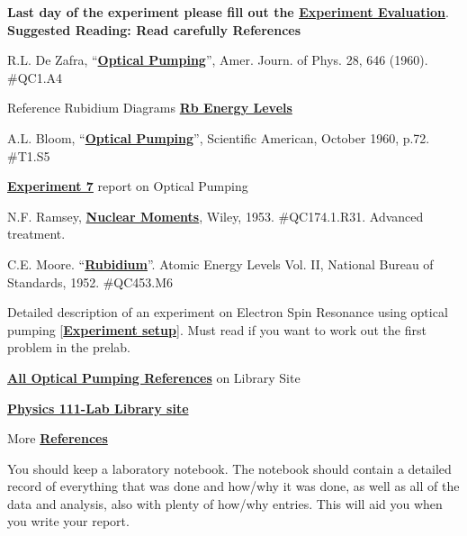 \documentclass{../lab}
\newcommand{\OpticalPumpingZafra}{http://physics111.lib.berkeley.edu/Physics111/Reprints/OPT/05-Optical_Pumping-DeZafra.pdf}
\newcommand{\RbEnergyLevels}{http://experimentationlab.berkeley.edu/sites/default/files/images/OPT_RbEnergyLevels.pdf}
\newcommand{\OpticalPumpingBloom}{http://physics111.lib.berkeley.edu/Physics111/Reprints/OPT/02-Optical_Pumping-Bloom.pdf}
\newcommand{\ExperimentSeven}{http://physics111.lib.berkeley.edu/Physics111/Reprints/OPT/06-Experiment_7.pdf}
\newcommand{\NuclearMoments}{http://physics111.lib.berkeley.edu/Physics111/Reprints/OPT/04-Nuclear_Moments.pdf}
\newcommand{\Rubidium}{http://physics111.lib.berkeley.edu/Physics111/Reprints/OPT/OPT\%20Rubidium.pdf}
\newcommand{\OPTReprints}{http://physics111.lib.berkeley.edu/Physics111/Reprints/OPT/OPT_index.html}
\begin{document}
\noindent\textbf{Last day of the experiment please fill out the \href{\ExperimentEvaluation}{\textbf{Experiment Evaluation}}}. \\

\noindent\textbf{Suggested Reading: Read carefully References \cite{Zafra,RbDiagrams,Bloom,ExperimentSeven}}
\begin{thebibliography}{}
R.L. De Zafra, ``\href{\OpticalPumpingZafra}{\textbf{Optical Pumping}}'', Amer. Journ. of Phys. 28, 646 (1960). \#QC1.A4

Reference Rubidium Diagrams \href{\RbEnergyLevels}{\textbf{Rb Energy Levels}}

A.L. Bloom, ``\href{\OpticalPumpingBloom}{\textbf{Optical Pumping}}'', Scientific American, October 1960, p.72. \#T1.S5

\href{\ExperimentSeven}{\textbf{Experiment 7}} report on Optical Pumping

N.F. Ramsey, \href{\NuclearMoments}{\textbf{Nuclear Moments}}, Wiley, 1953. \#QC174.1.R31. Advanced treatment.

C.E. Moore. ``\href{\Rubidium}{\textbf{Rubidium}}''. Atomic Energy Levels Vol. II, National Bureau of Standards, 1952. \#QC453.M6

Detailed description of an experiment on Electron Spin Resonance using optical pumping [\href{\ExperimentSeven}{\textbf{Experiment setup}}]. Must read if you want to work out the first problem in the prelab.

\href{\OPTReprints}{\textbf{All Optical Pumping References}} on Library Site

\href{http://physics111.lib.berkeley.edu/Physics111/Reprints/OPT/OPT_index.html}{\textbf{Physics 111-Lab Library site}}
\end{thebibliography}

\vspace{1em}

\noindent More \hyperref[references]{\textbf{References}}

\vspace{1em}

\noindent You should keep a laboratory notebook. The notebook should contain a detailed record of everything that was done and how/why it was done, as well as all of the data and analysis, also with plenty of how/why entries. This will aid you when you write your report.
\end{document}
